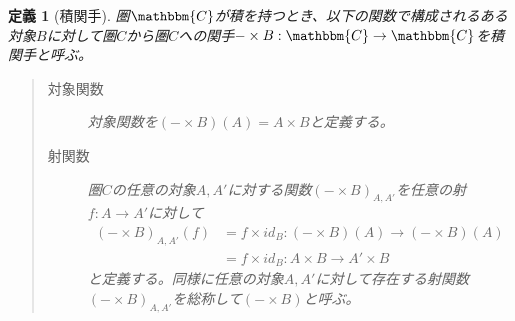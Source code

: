 \documentclass[dvipdfmx]{jsarticle}
\newcommand{\cat}[1]{\mathbbm{#1}}
\newcommand{\arrow}{\rightarrow}
\newcommand{\functor}[3]{#1:\cat{#2}\arrow \cat{#3}}
\newcommand{\mor}[3]{#1:#2\arrow #3}
\newtheorem{define}{定義}[section]
\numberwithin{proof}{subsection}
\numberwithin{prop}{subsection}
\numberwithin{define}{subsection}
\begin{document}
	\begin{define}[積関手]
		圏$\cat{C}$が積を持つとき、以下の関数で構成されるある対象$B$に対して圏$C$から圏$C$への関手$\functor{-\times B}{C}{C}$を積関手と呼ぶ。
		\begin{quote}
			\begin{description}
			\item[対象関数] 対象関数を$(-\times B)(A)=A\times B$と定義する。
			\item[射関数] 圏$C$の任意の対象$A,A'$に対する関数$(-\times B)_{A,A'}$を任意の射$\mor{f}{A}{A'}$に対して
			\begin{align*}
				(-\times B)_{A,A'}(f)&=\mor{f\times id_B}{(-\times B)(A)}{(-\times B)(A)}\\
				&=\mor{f\times id_B}{A\times B}{A'\times B}
			\end{align*}
			と定義する。同様に任意の対象$A,A'$に対して存在する射関数$(-\times B)_{A,A'}$を総称して$(-\times B)$と呼ぶ。
			\begin{center}
\end{center}
\end{description}
\end{quote}
\end{define}
\end{document}
